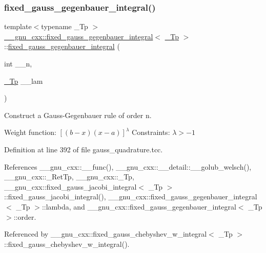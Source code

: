 \subsubsection{\texorpdfstring{fixed\+\_\+gauss\+\_\+gegenbauer\+\_\+integral()}{fixed\_gauss\_gegenbauer\_integral()}}
{\footnotesize\ttfamily template$<$typename \+\_\+\+Tp $>$ \\
\hyperlink{struct____gnu__cxx_1_1fixed__gauss__gegenbauer__integral}{\+\_\+\+\_\+gnu\+\_\+cxx\+::fixed\+\_\+gauss\+\_\+gegenbauer\+\_\+integral}$<$ \hyperlink{namespace____gnu__cxx_a3b19a9c800ca194374ef9172290f7d79}{\+\_\+\+Tp} $>$\+::\hyperlink{struct____gnu__cxx_1_1fixed__gauss__gegenbauer__integral}{fixed\+\_\+gauss\+\_\+gegenbauer\+\_\+integral} (\begin{DoxyParamCaption}\item[{int}]{\+\_\+\+\_\+n,  }\item[{\hyperlink{namespace____gnu__cxx_a3b19a9c800ca194374ef9172290f7d79}{\+\_\+\+Tp}}]{\+\_\+\+\_\+lam }\end{DoxyParamCaption})\hspace{0.3cm}{\ttfamily [explicit]}}

Construct a Gauss-\/\+Gegenbauer rule of order {\ttfamily n}.

Weight function\+: $ [(b-x)(x-a)]^\lambda $ Constraints\+: $ \lambda > -1 $ 

Definition at line 392 of file gauss\+\_\+quadrature.\+tcc.



References \+\_\+\+\_\+gnu\+\_\+cxx\+::\+\_\+\+\_\+func(), \+\_\+\+\_\+gnu\+\_\+cxx\+::\+\_\+\+\_\+detail\+::\+\_\+\+\_\+golub\+\_\+welsch(), \+\_\+\+\_\+gnu\+\_\+cxx\+::\+\_\+\+Ret\+Tp, \+\_\+\+\_\+gnu\+\_\+cxx\+::\+\_\+\+Tp, \+\_\+\+\_\+gnu\+\_\+cxx\+::fixed\+\_\+gauss\+\_\+jacobi\+\_\+integral$<$ \+\_\+\+Tp $>$\+::fixed\+\_\+gauss\+\_\+jacobi\+\_\+integral(), \+\_\+\+\_\+gnu\+\_\+cxx\+::fixed\+\_\+gauss\+\_\+gegenbauer\+\_\+integral$<$ \+\_\+\+Tp $>$\+::lambda, and \+\_\+\+\_\+gnu\+\_\+cxx\+::fixed\+\_\+gauss\+\_\+gegenbauer\+\_\+integral$<$ \+\_\+\+Tp $>$\+::order.



Referenced by \+\_\+\+\_\+gnu\+\_\+cxx\+::fixed\+\_\+gauss\+\_\+chebyshev\+\_\+w\+\_\+integral$<$ \+\_\+\+Tp $>$\+::fixed\+\_\+gauss\+\_\+chebyshev\+\_\+w\+\_\+integral().


